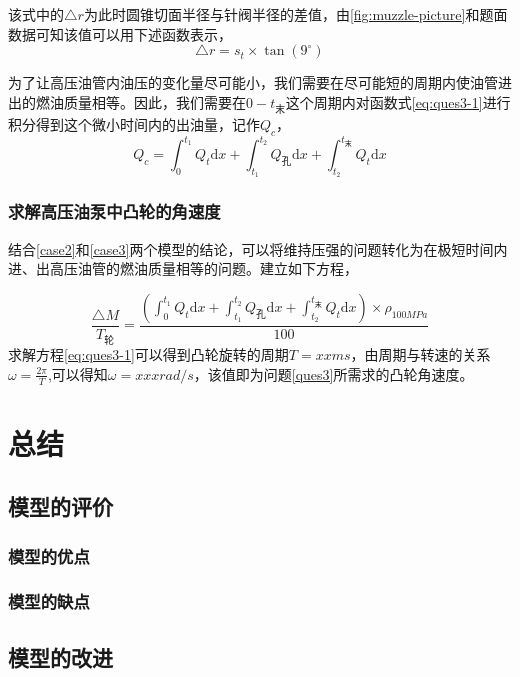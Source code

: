\documentclass{cumcmthesis}
\begin{document}
该式中的$\triangle r$为此时圆锥切面半径与针阀半径的差值，由\cref{fig:muzzle-picture}和题面数据可知该值可以用下述函数表示，
\begin{equation*}
\triangle r = s_{t}\times\tan(9^{\circ})\label{eq:ques3-3}	
\end{equation*}
 
为了让高压油管内油压的变化量尽可能小，我们需要在尽可能短的周期内使油管进出的燃油质量相等。因此，我们需要在$0-t_{\text{末}}$这个周期内对函数式\cref{eq:ques3-1}进行积分得到这个微小时间内的出油量，记作$Q_{c}$，
\begin{equation}
Q_{c} = \int_{0}^{t_{1}}Q_{t}\text{d}x+\int_{t_{1}}^{t_{2}}Q_{\text{孔}}\text{d}x+\int_{t_{2}}^{t_{\text{末}}}Q_{t}\text{d}x \label{eq:ques3-4}	
\end{equation}

\subsubsection{求解高压油泵中凸轮的角速度}
结合\ref{case2}和\ref{case3}两个模型的结论，可以将维持压强的问题转化为在极短时间内进、出高压油管的燃油质量相等的问题。建立如下方程，

\begin{equation*}
 \frac{\triangle M}{T_{\text{轮}}}=\frac{\left(\int_{0}^{t_{1}}Q_{t}\text{d}x+\int_{t_{1}}^{t_{2}}Q_{\text{孔}}\text{d}x+\int_{t_{2}}^{t_{\text{末}}}Q_{t}\text{d}x\right)\times \rho_{100MPa}}{100}\label{eq:ques3-99}	
\end{equation*}
求解方程\cref{eq:ques3-1}可以得到凸轮旋转的周期$T = xxms$，由周期与转速的关系$\omega = \frac{2\pi}{T}$,可以得知$\omega = xxx rad/s$，该值即为问题\ref{ques3}所需求的凸轮角速度。

\section{总结}
\subsection{模型的评价}
\subsubsection{模型的优点}
\subsubsection{模型的缺点}
\subsection{模型的改进}
\end{document}
